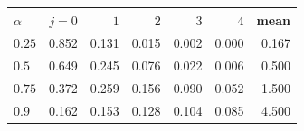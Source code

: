 \begin{tabular}{|l|r|r|r|r|r|r|}
\hline
$\alpha$ & $j{=}0$ & $1$ & $2$ & $3$ & $4$ & mean \\
\hline
$0.25$ & 0.852 & 0.131 & 0.015 & 0.002 & 0.000 & 0.167 \\
$0.5$ & 0.649 & 0.245 & 0.076 & 0.022 & 0.006 & 0.500 \\
$0.75$ & 0.372 & 0.259 & 0.156 & 0.090 & 0.052 & 1.500 \\
$0.9$ & 0.162 & 0.153 & 0.128 & 0.104 & 0.085 & 4.500 \\
\hline
\end{tabular}
